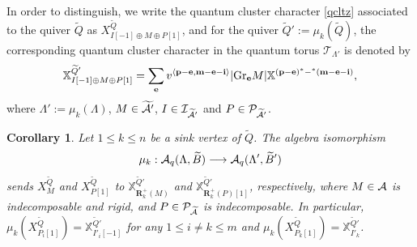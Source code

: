 \documentclass[reqno,12pt]{amsart}
\numberwithin{equation}{section}
\def\lr#1{\langle #1\rangle} \def\fin{\hfill$\square$}  \def\lra{\longrightarrow} \def\mod{\mbox{\rm \textbf{mod}}\,}\def\Mod{\mbox{\rm mod}\,}\def\top{\mbox{\rm top}\,}\def\soc{\mbox{\rm soc}\,}
\def\P{\mathcal{P}}\def\I{\mathcal{I}}\def\X{\mathbb X}\def\T{\mathbb T}\def\e{\mbox{\rm e}}
\theoremstyle{plain} %
\newtheorem{corollary}[theorem]{\bf Corollary}
\theoremstyle{definition} %
\begin{document}
In order to distinguish,
we write the quantum cluster character \eqref{qcltz} associated to the quiver $\widetilde{Q}$ as $X^{\widetilde{Q}}_{I[-1]\oplus M\oplus P[1]}$, and for the quiver $\widetilde{Q}':=\mu_k(\widetilde{Q})$, the corresponding quantum cluster character in the quantum torus $\mathcal{T}_{\Lambda'}$ is denoted by
\begin{equation*}\mathbb{X}^{\widetilde{Q}'}_{I[-1]\oplus M\oplus P[1]}=\sum\limits_{\mathbf{e}}v^{\lr{{\bf p}-\mathbf{e},\mathbf{m}-\mathbf{e}-\mathbf{i}}}|\mathrm{Gr}_{\mathbf{e}}M|
\mathbb{X}^{({\bf p}-\mathbf{e})^\ast-^\ast(\mathbf{m}-\mathbf{e}-\mathbf{i})},\end{equation*}
where ${\Lambda'}:=\mu_k(\Lambda)$, $M\in\widetilde{\mathcal{A}'}$, $I\in\I_{\widetilde{\A'}}$ and $P\in\P_{\widetilde{\A'}}$.
\begin{corollary}
Let $1\leq k\leq n$ be a sink vertex of $\widetilde{Q}$. The algebra isomorphism $$\mu_k:\mathcal{A}_q(\Lambda,\widetilde{B})\longrightarrow\mathcal{A}_q(\Lambda',\widetilde{B}')$$
sends $X_M^{\widetilde{Q}}$ and $X_{P[1]}^{\widetilde{Q}}$ to $\mathbb{X}_{\mathbf{R}_k^+(M)}^{\widetilde{Q}'}$ and $\mathbb{X}_{\mathbf{R}_k^+(P)[1]}^{\widetilde{Q}'}$, respectively, where $M\in \mathcal{A}$ is indecomposable and rigid, and $P\in \mathcal{P}_{\widetilde{\mathcal{A}}}$ is indecomposable. In particular, $\mu_k(X_{P_i[1]}^{\widetilde{Q}})=\mathbb{X}_{I'_i[-1]}^{\widetilde{Q}'}$ for any $1\leq i\neq k\leq m$ and $\mu_k(X_{P_k[1]}^{\widetilde{Q}})=\mathbb{X}_{I'_k}^{\widetilde{Q}'}$.
\end{corollary}


\appendix
\end{document}
